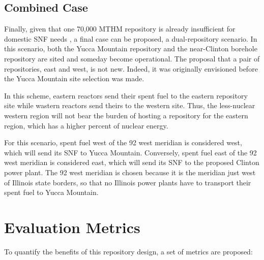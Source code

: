 \subsection{Combined Case}
Finally, given that one 70,000 MTHM repository is already insufficient for 
domestic \gls{SNF} needs \cite{doe_report_2008}, a final case can be proposed, 
a dual-repository scenario. In this scenario, both the Yucca Mountain 
repository and the near-Clinton borehole repository are sited and someday 
become operational. The proposal that a pair of repositories, east and west, is 
not new. Indeed, it was originally envisioned before the Yucca Mountain site 
selection was made.

In this scheme, eastern reactors send their spent fuel to the eastern 
repository site while wastern reactors send theirs to the western site. Thus, 
the less-nuclear western region will not bear the burden of hosting a 
repository for the eastern region, which has a higher percent of nuclear 
energy. 

For this scenario, spent fuel west of the 92 west meridian is considered west, 
which will send its \gls{SNF} to Yucca Mountain. Conversely, spent fuel east of the 92 west
meridian is considered east, which will send its \gls{SNF} to the proposed Clinton 
power plant. The 92 west meridian is chosen because it is the meridian just west of
Illinois state borders, so that no Illinois power plants have to transport their
spent fuel to Yucca Mountain. %

\section{Evaluation Metrics}

To quantify the benefits of this repository design, a set of metrics are 
proposed:

